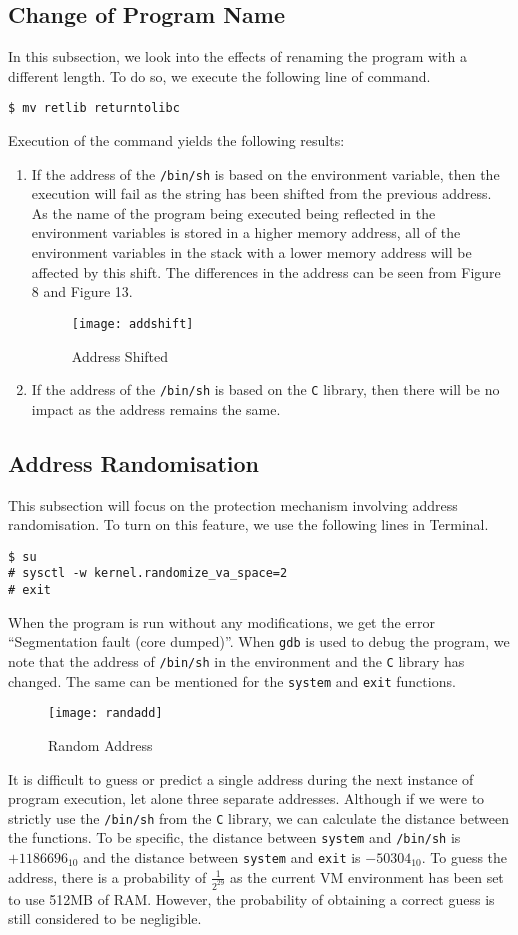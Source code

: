 \documentclass[a4paper,12pt]{article}
\begin{document}
\subsection{Change of Program Name}
In this subsection, we look into the effects of renaming the program with a different length. To do so, we execute the following line of command.
\begin{verbatim}
$ mv retlib returntolibc
\end{verbatim}
Execution of the command yields the following results:
\begin{enumerate}
	\item If the address of the \texttt{/bin/sh} is based on the environment variable, then the execution will fail as the string has been shifted from the previous address. As the name of the program being executed being reflected in the environment variables is stored in a higher memory address, all of the environment variables in the stack with a lower memory address will be affected by this shift. The differences in the address can be seen from Figure 8 and Figure 13.
\begin{figure}[H]
	\centering
	\texttt{[image: addshift]}
	\caption{Address Shifted}
	\label{fig:addshift}
\end{figure}
	\item If the address of the \texttt{/bin/sh} is based on the \texttt{C} library, then there will be no impact as the address remains the same.
\end{enumerate}
\subsection{Address Randomisation}
This subsection will focus on the protection mechanism involving address randomisation. To turn on this feature, we use the following lines in Terminal.
\begin{verbatim}
$ su
# sysctl -w kernel.randomize_va_space=2
# exit
\end{verbatim}
When the program is run without any modifications, we get the error ``Segmentation fault (core dumped)''. When \texttt{gdb} is used to debug the program, we note that the address of \texttt{/bin/sh} in the environment and the \texttt{C} library has changed. The same can be mentioned for the \texttt{system} and \texttt{exit} functions.
\begin{figure}[H]
	\centering
	\texttt{[image: randadd]}
	\caption{Random Address}
	\label{fig:randadd}
\end{figure}
\noindent It is difficult to guess or predict a single address during the next instance of program execution, let alone three separate addresses. Although if we were to strictly use the \texttt{/bin/sh} from the \texttt{C} library, we can calculate the distance between the functions. To be specific, the distance between \texttt{system} and \texttt{/bin/sh} is $+1186696_{10}$ and the distance between \texttt{system} and \texttt{exit} is $-50304_{10}$. To guess the address, there is a probability of $\frac{1}{2^{29}}$ as the current VM environment has been set to use 512MB of RAM. However, the probability of obtaining a correct guess is still considered to be negligible.
\end{document}
